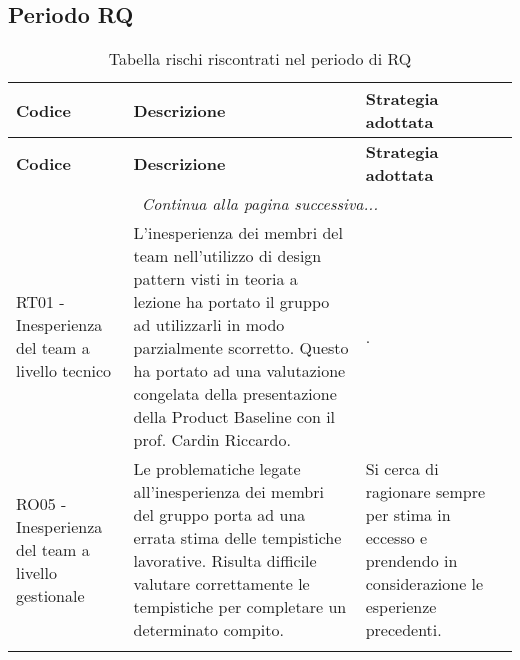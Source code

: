 \documentclass[../piano_di_progetto.tex]{subfiles}
\begin{document}
\subsection{Periodo RQ}
\label{sub:rischi_rq}
\begin{center}
	\begin{longtable}{|p{4cm}|p{6cm}|p{6cm}|}
		\hline
		\rowcolor{lightgray}
		{\textbf{Codice}} & {\textbf{Descrizione}} & {\textbf{Strategia adottata}} \\
		\hline
		\endfirsthead
	
		\hline
		\rowcolor{lightgray}
		{\textbf{Codice}} & {\textbf{Descrizione}} & {\textbf{Strategia adottata}} \\
		\hline
		\endhead
		
		\hline
		\multicolumn{3}{|c|}{\emph{Continua alla pagina successiva...}}\\
		\hline
		\endfoot

		\endlastfoot
        RT01 - Inesperienza del team a livello tecnico
        & L'inesperienza dei membri del team nell'utilizzo di design pattern visti in teoria a lezione ha portato il gruppo ad utilizzarli in modo parzialmente scorretto. Questo ha portato ad una valutazione congelata della presentazione della Product Baseline con il prof. Cardin Riccardo. 
		& . \\
		
		RO05 - Inesperienza del team a livello gestionale
        & Le problematiche legate all'inesperienza dei membri del gruppo porta ad una errata stima delle tempistiche lavorative. Risulta difficile valutare correttamente le tempistiche per completare un determinato compito. 
        & Si cerca di ragionare sempre per stima in eccesso e prendendo in considerazione le esperienze precedenti.\\
        \hline
		\rowcolor{white}
		\caption{Tabella rischi riscontrati nel periodo di RQ}
	\end{longtable}

\end{center}
\end{document}
